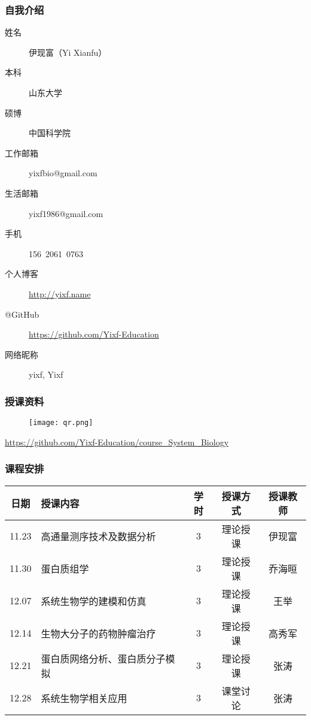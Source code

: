 \begin{frame}
  \frametitle{自我介绍}
    \begin{description}
      \item[姓\qquad 名]伊现富（Yi Xianfu）
      \item[本\qquad 科]山东大学
      \item[硕\qquad 博]中国科学院
      \item[工作邮箱]\alert{yixfbio@gmail.com}
      \item[生活邮箱]yixf1986@gmail.com
      \item[手\qquad 机]\alert{156\ 2061\ 0763}
      \item[个人博客]\href{http://yixf.name}{http://yixf.name}
      \item[@GitHub]\alert{\href{https://github.com/Yixf-Education}{https://github.com/Yixf-Education}}
      \item[网络昵称]yixf, Yixf
    \end{description}
\end{frame}

\begin{frame}
  \frametitle{授课资料}
  \begin{figure}
    \centering
    \texttt{[image: qr.png]}
  \end{figure}
  \begin{center}
  \href{https://github.com/Yixf-Education/course_System_Biology}{https://github.com/Yixf-Education/course\_System\_Biology}
  \end{center}
\end{frame}

\begin{frame}
  \frametitle{课程安排}
  \begin{table}
    \centering
    \begin{tabular}{clccc}
      \hline
      \rowcolor{blue!50}日期 & 授课内容 & 学时 & 授课方式 & 授课教师\\
      \hline
      11.23 & 高通量测序技术及数据分析 & 3 & 理论授课 & 伊现富\\
      11.30 & 蛋白质组学 & 3 & 理论授课 & 乔海晅\\
      12.07 & 系统生物学的建模和仿真 & 3 & 理论授课 & 王举\\
      12.14 & 生物大分子的药物肿瘤治疗 & 3 & 理论授课 & 高秀军\\
      12.21 & 蛋白质网络分析、蛋白质分子模拟 & 3 & 理论授课 & 张涛\\
      12.28 & 系统生物学相关应用 & 3 & 课堂讨论 & 张涛\\
      \hline
    \end{tabular}
  \end{table}
\end{frame}
